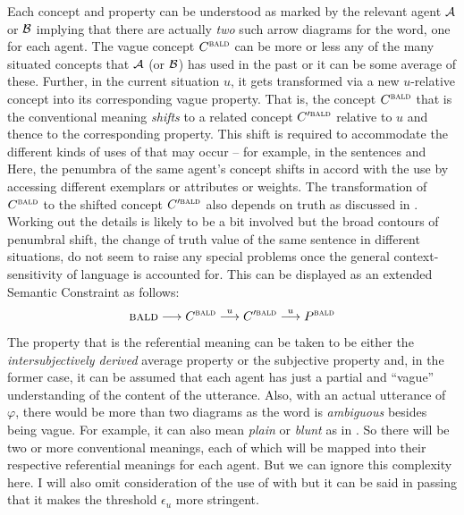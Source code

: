 \noindent Each concept and property can be understood as marked by the relevant agent $\cal A$ or $\cal B$ implying that there are actually \emph{two} such arrow diagrams for the word, one for each agent. The vague concept $C^{\Expression{bald}}$ can be more or less any of the many situated concepts that $\cal A$ (or $\cal B$) has used in the past or it can be some average of these. Further, in the current situation $u$, it gets transformed via a new $u$-relative concept into its corresponding vague property. That is, the concept $C^{\Expression{bald}}$ that is the conventional meaning \emph{shifts} to a related concept $C'^{\Expression{bald}}$ relative to $u$ and thence to the corresponding property. This shift is required to accommodate the different kinds of uses of  that may occur -- for example, in the sentences  and  Here, the penumbra of the same agent's concept shifts in accord with the use by accessing different exemplars or attributes or weights. The transformation of $C^{\Expression{bald}}$ to the shifted concept $C'^{\Expression{bald}}$ also depends on truth as discussed in . Working out the details is likely to be a bit involved but the broad contours of penumbral shift, the change of truth value of the same sentence in different situations, do not seem to raise any special problems once the general context-sensitivity of language is accounted for. This can be displayed as an extended Semantic Constraint as follows:
\[ \Expression{bald} \longrightarrow C^{\Expression{bald}} \stackrel{u}\longrightarrow C'^{\Expression{bald}} \stackrel{u}\longrightarrow P^\Expression{bald} \]

The property that is the referential meaning can be taken to be either the \emph{intersubjectively derived} average property or the subjective property and, in the former case, it can be assumed that each agent has just a partial and ``vague'' understanding of the content of the utterance. Also, with an actual utterance of $\varphi$, there would be more than two diagrams as the word  is \emph{ambiguous} besides being vague. For example, it can also mean \emph{plain} or \emph{blunt} as in . So there will be two or more conventional meanings, each of which will be mapped into their respective referential meanings for each agent. But we can ignore this complexity here. I will also omit consideration of the use of  with  but it can be said in passing that it makes the threshold $\epsilon_u$ more stringent.

